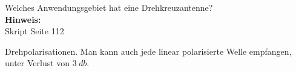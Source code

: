 \begin{question}[section=11,name={Drehkreuzantenne 1},difficulty=,quantity=4,type=thr,tags={20160310,20131210}]
	Welches Anwendungsgebiet hat eine Drehkreuzantenne?
	\\ \textbf{Hinweis:}\\
	Skript Seite 112
\end{question}
\begin{solution}
	Drehpolarisationen. Man kann auch jede linear polarisierte Welle empfangen, unter Verlust von $3~db$.
\end{solution}